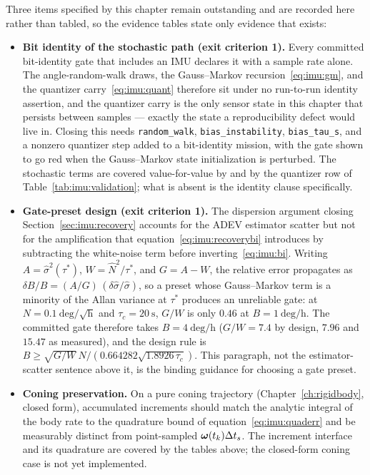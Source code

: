 Three items specified by this chapter remain outstanding and are recorded
here rather than tabled, so the evidence tables state only evidence that
exists:
\begin{itemize}
  \item \textbf{Bit identity of the stochastic path (exit criterion 1).}
    Every committed bit-identity gate that includes an IMU declares it with
    a sample rate alone. The angle-random-walk draws, the Gauss--Markov
    recursion~\eqref{eq:imu:gm}, and the quantizer
    carry~\eqref{eq:imu:quant} therefore sit under no run-to-run identity
    assertion, and the quantizer carry is the only sensor state in this
    chapter that persists between samples --- exactly the state a
    reproducibility defect would live in. Closing this needs
    \texttt{random\_walk}, \texttt{bias\_instability}, \texttt{bias\_tau\_s},
    and a nonzero quantizer step added to a bit-identity mission, with the
    gate shown to go red when the Gauss--Markov state initialization is
    perturbed. The stochastic terms are covered value-for-value by
     and by the
    quantizer row of Table~\ref{tab:imu:validation}; what is absent is the
    identity clause specifically.
  \item \textbf{Gate-preset design (exit criterion 1).} The dispersion
    argument closing Section~\ref{sec:imu:recovery} accounts for the ADEV
    estimator scatter but not for the amplification that
    equation~\eqref{eq:imu:recoverybi} introduces by subtracting the
    white-noise term before inverting~\eqref{eq:imu:bi}. Writing
    $A = \hat{\sigma}^2(\tau^{*})$, $W = \hat{N}^2/\tau^{*}$, and
    $G = A - W$, the relative error propagates as $\delta B/B =
    (A/G)\,(\delta\hat{\sigma}/\hat{\sigma})$, so a preset whose
    Gauss--Markov term is a minority of the Allan variance at $\tau^{*}$
    produces an unreliable gate: at $N = 0.1\ \mathrm{deg}/\sqrt{\mathrm{h}}$
    and $\tau_c = \qty{20}{\second}$, $G/W$ is only $0.46$ at
    $B = 1\ \mathrm{deg/h}$. The committed gate therefore takes
    $B = 4\ \mathrm{deg/h}$ ($G/W = 7.4$ by design, $7.96$ and $15.47$ as
    measured), and the design rule is $B \ge \sqrt{G/W}\,N/(0.664282
    \sqrt{1.8926\,\tau_c})$. This paragraph, not the estimator-scatter
    sentence above it, is the binding guidance for choosing a gate preset.
  \item \textbf{Coning preservation.} On a pure coning trajectory
    (Chapter~\ref{ch:rigidbody}, closed form), accumulated increments
    should match the analytic integral of the body rate to the quadrature
    bound of equation~\eqref{eq:imu:quaderr} and be measurably distinct
    from point-sampled $\bm{\omega}(t_k)\Delta t_s$. The increment
    interface and its quadrature are covered by the tables above; the
    closed-form coning case is not yet implemented.
\end{itemize}

